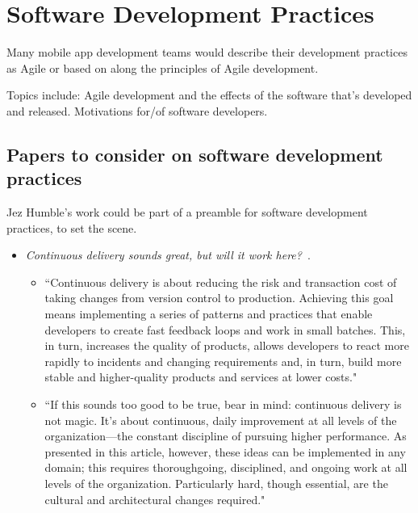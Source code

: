 \section{Software Development Practices}
Many mobile app development teams would describe their development practices as Agile or based on along the principles of Agile development. %

Topics include: Agile development and the effects of the software that's developed and released. Motivations for/of software developers.

\subsection{Papers to consider on software development practices}
Jez Humble's work could be part of a preamble for software development practices, to set the scene.

\begin{itemize}
    \item \emph{Continuous delivery sounds great, but will it work here?}~\citep{humble2018_continuous_delivery_sounds_great}. 
    \begin{itemize}
        \item ``Continuous delivery is about reducing the risk and transaction cost of taking changes from version control to production. Achieving this goal means implementing a series of patterns and practices that enable developers to create fast feedback loops and work in small batches. This, in turn, increases the quality of products, allows developers to react more rapidly to incidents and changing requirements and, in turn, build more stable and higher-quality products and services at lower costs."
        \item ``If this sounds too good to be true, bear in mind: continuous delivery is not magic. It's about continuous, daily improvement at all levels of the organization—the constant discipline of pursuing higher performance. As presented in this article, however, these ideas can be implemented in any domain; this requires thoroughgoing, disciplined, and ongoing work at all levels of the organization. Particularly hard, though essential, are the cultural and architectural changes required."
    \end{itemize}
    
\end{itemize}

